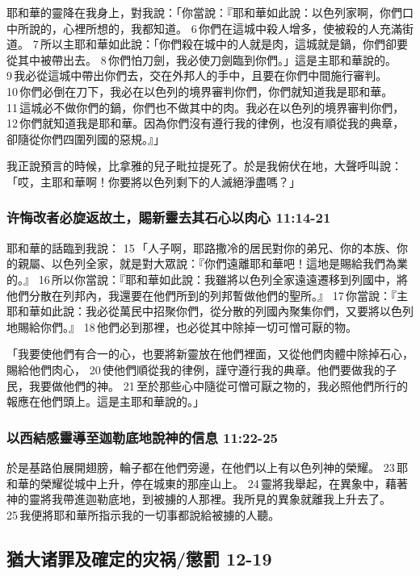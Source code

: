 耶和華的靈降在我身上，對我說：「你當說：『耶和華如此說：以色列家啊，你們口中所說的，心裡所想的，我都知道。 6 你們在這城中殺人增多，使被殺的人充滿街道。 7 所以主耶和華如此說：「你們殺在城中的人就是肉，這城就是鍋，你們卻要從其中被帶出去。 8 你們怕刀劍，我必使刀劍臨到你們。」這是主耶和華說的。 9 我必從這城中帶出你們去，交在外邦人的手中，且要在你們中間施行審判。 10 你們必倒在刀下，我必在以色列的境界審判你們，你們就知道我是耶和華。 11 這城必不做你們的鍋，你們也不做其中的肉。我必在以色列的境界審判你們， 12 你們就知道我是耶和華。因為你們沒有遵行我的律例，也沒有順從我的典章，卻隨從你們四圍列國的惡規。』」

我正說預言的時候，比拿雅的兒子毗拉提死了。於是我俯伏在地，大聲呼叫說：「哎，主耶和華啊！你要將以色列剩下的人滅絕淨盡嗎？」

\subsubsection{许悔改者必旋返故土，賜新靈去其石心以肉心 11:14-21}
耶和華的話臨到我說： 15 「人子啊，耶路撒冷的居民對你的弟兄、你的本族、你的親屬、以色列全家，就是對大眾說：『你們遠離耶和華吧！這地是賜給我們為業的。』 16 所以你當說：『耶和華如此說：我雖將以色列全家遠遠遷移到列國中，將他們分散在列邦內，我還要在他們所到的列邦暫做他們的聖所。』 17 你當說：『主耶和華如此說：我必從萬民中招聚你們，從分散的列國內聚集你們，又要將以色列地賜給你們。』 18 他們必到那裡，也必從其中除掉一切可憎可厭的物。

「我要使他們有合一的心，也要將新靈放在他們裡面，又從他們肉體中除掉石心，賜給他們肉心， 20 使他們順從我的律例，謹守遵行我的典章。他們要做我的子民，我要做他們的神。 21 至於那些心中隨從可憎可厭之物的，我必照他們所行的報應在他們頭上。這是主耶和華說的。」

\subsubsection{以西結感靈導至迦勒底地說神的信息 11:22-25}
於是基路伯展開翅膀，輪子都在他們旁邊，在他們以上有以色列神的榮耀。 23 耶和華的榮耀從城中上升，停在城東的那座山上。 24 靈將我舉起，在異象中，藉著神的靈將我帶進迦勒底地，到被擄的人那裡。我所見的異象就離我上升去了。 25 我便將耶和華所指示我的一切事都說給被擄的人聽。

\subsection{猶大诸罪及確定的灾祸/懲罰 12-19}
